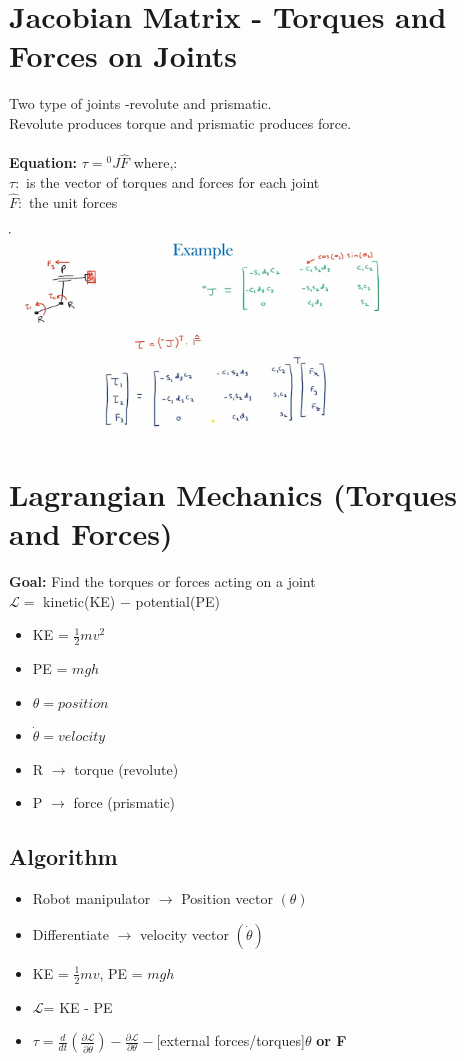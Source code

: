 \documentclass{article}
\begin{document}
\section{Jacobian Matrix - Torques and Forces on Joints}
Two type of joints -revolute and prismatic.\\
Revolute produces torque and prismatic produces force.\\\\
\textbf{Equation:} $\tau = {}^0J \hat{F}$ where,:\\
$\tau:$ is the vector of torques and forces for each joint\\
$\hat{F}: $ the unit forces\\\\
\includegraphics[width=10cm]{torques_forces_example.png}


\section{Lagrangian Mechanics (Torques and Forces)}
\textbf{Goal:} Find the torques or forces acting on a joint\\
$\mathcal{L}=$ kinetic(KE) $-$ potential(PE)\\
\begin{itemize}
    \item KE = $\frac{1}{2}mv^2$
    \item PE = $mgh$
    \item $\theta = position$
    \item $\dot{\theta} = velocity$
    \item R $\rightarrow$ torque (revolute)
    \item P $\rightarrow$ force (prismatic)
\end{itemize}

\subsection{Algorithm}
\begin{itemize}
    \item Robot manipulator $\rightarrow$ Position vector $(\theta)$
    \item Differentiate $\rightarrow$ velocity vector $(\dot{\theta})$
    \item KE = $\frac{1}{2}mv$, PE = $mgh$
    \item $\mathcal{L}$= KE - PE
    \item $\tau = \frac{d}{dt}(\frac{\partial \mathcal{L}}{\partial \dot{\theta}}) - \frac{\partial \mathcal{L}}{\partial \theta} - $[external forces/torques]$\theta$ \textbf{or F}
\end{itemize}
\end{document}
